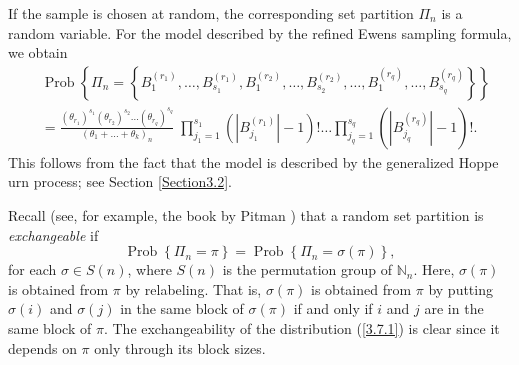 \documentclass[12pt]{amsart}
\theoremstyle{definition}
\numberwithin{equation}{section}
\DeclareMathOperator{\Prob}{Prob}
\begin{document}
If the sample is chosen at random, the corresponding set partition $\Pi_n$ is a random variable. For the model described by the refined
Ewens sampling formula, we obtain
\begin{equation}\label{3.7.1}
\begin{split}
&\Prob\left\{\Pi_n=\left\{B_1^{(r_1)},\ldots,B_{s_1}^{(r_1)},
B_1^{(r_2)},\ldots,B_{s_2}^{(r_2)},\ldots,
B_1^{(r_q)},\ldots,B_{s_q}^{(r_q)}\right\}\right\}\\
&=\frac{(\theta_{r_1})^{s_1}(\theta_{r_2})^{s_2}\ldots(\theta_{r_q})^{s_q}}{(\theta_1+\ldots+\theta_k)_n}\;
\prod\limits_{j_1=1}^{s_1}\left(|B_{j_1}^{(r_1)}|-1\right)!
\ldots
\prod\limits_{j_q=1}^{s_q}\left(|B_{j_q}^{(r_q)}|-1\right)!.
\end{split}
\end{equation}
This follows from the fact that the model is described by the generalized Hoppe urn process; see Section \ref{Section3.2}.

Recall (see, for example, the book by Pitman \cite{PitmanBookCombinatorialProcesses}) that a random set partition is \textit{exchangeable} if
\begin{equation}
\Prob\left\{\Pi_n=\pi\right\}=\Prob\left\{\Pi_n=\sigma(\pi)\right\},
\end{equation}
for each $\sigma\in S(n)$, where $S(n)$ is the permutation group of $\mathbb{N}_n$. Here, $\sigma(\pi)$ is obtained from $\pi$ by relabeling.
That is, $\sigma(\pi)$ is obtained from $\pi$ by putting $\sigma(i)$ and
$\sigma(j)$ in the same block of $\sigma(\pi)$ if and only if $i$ and $j$ are in the same block of $\pi$. The exchangeability of the distribution
(\ref{3.7.1}) is clear since it depends on $\pi$ only through its block sizes.
\end{document}
